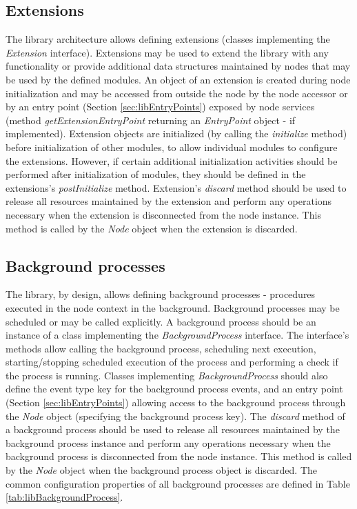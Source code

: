 \subsection{Extensions}
\label{sec:libExtenstions}

The library architecture allows defining extensions (classes implementing the \emph{Extension} interface). Extensions may be used to extend the library with any functionality or provide additional data structures maintained by nodes that may be used by the defined modules. An object of an extension is created during node initialization and may be accessed from outside the node by the node accessor or by an entry point (Section \ref{sec:libEntryPoints}) exposed by node services (method \emph{getExtensionEntryPoint} returning an \emph{EntryPoint} object - if implemented). Extension objects are initialized (by calling the \emph{initialize} method) before initialization of other modules, to allow individual modules to configure the extensions. However, if certain additional initialization activities should be performed after initialization of modules, they should be defined in the extensions's \emph{postInitialize} method. Extension's \emph{discard} method should be used to release all resources maintained by the extension and perform any operations necessary when the extension is disconnected from the node instance. This method is called by the \emph{Node} object when the extension is discarded.






\subsection{Background processes}

The library, by design, allows defining background processes - procedures executed in the node context in the background. Background processes may be scheduled or may be called explicitly. A background process should be an instance of a class implementing the \emph{BackgroundProcess} interface. The interface's methods allow calling the background process, scheduling next execution, starting/stopping scheduled execution of the process and performing a check if the process is running. Classes implementing \emph{BackgroundProcess} should also define the event type key for the background process events, and an entry point (Section \ref{sec:libEntryPoints}) allowing access to the background process through the \emph{Node} object (specifying the background process key). The \emph{discard} method of a background process should be used to release all resources maintained by the background process instance and perform any operations necessary when the background process is disconnected from the node instance. This method is called by the \emph{Node} object when the background process object is discarded. The common configuration properties of all background processes are defined in Table \ref{tab:libBackgroundProcess}.

